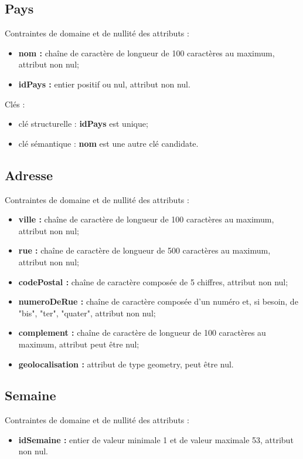 \documentclass[asi, sansVersion]{picInsa}
\begin{document}
\subsection*{Pays}
Contraintes de domaine et de nullité des attributs :
\begin{itemize}
	\item \textbf{nom :} chaîne de caractère de longueur de 100 caractères au maximum, attribut non nul;
	\item \textbf{idPays :} entier positif ou nul, attribut non nul. \\
\end{itemize}

Clés : 
\begin{itemize}
\item clé structurelle : \textbf{idPays} est unique;
\item clé sémantique : \textbf{nom} est une autre clé candidate. \\ 
\end{itemize}


\subsection*{Adresse}
Contraintes de domaine et de nullité des attributs :
\begin{itemize}
 	\item \textbf{ville :} chaîne de caractère de longueur de 100 caractères au maximum, attribut non nul;
	\item \textbf{rue :} chaîne de caractère de longueur de 500 caractères au maximum, attribut non nul;
	\item \textbf{codePostal :} chaîne de caractère composée de 5 chiffres, attribut non nul;
	\item \textbf{numeroDeRue :} chaîne de caractère composée d'un numéro et, si besoin, de "bis", "ter", "quater", attribut non nul; 
	\item \textbf{complement : } chaîne de caractère de longueur de 100 caractères au maximum, attribut peut être nul;
	\item \textbf{geolocalisation : } attribut de type geometry, peut être nul.\\
\end{itemize}

\subsection*{Semaine}
Contraintes de domaine et de nullité des attributs : 
\begin{itemize}
	\item \textbf{idSemaine :} entier de valeur minimale 1 et de valeur maximale 53, attribut non nul.
\end{itemize}
\end{document}
